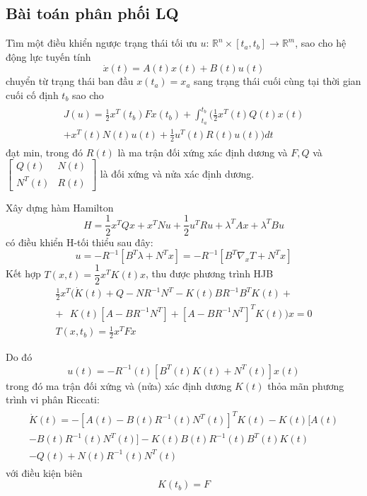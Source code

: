 \documentclass[11pt]{beamer}
\begin{document}
\subsection{Bài toán phân phối LQ}
\begin{frame}
	Tìm một điều khiển ngược trạng thái tối ưu $u$: $\mathbb{R}^n \times [t_a, t_b] \to \mathbb{R}^m$, sao cho hệ động lực tuyến tính \begin{equation}
	\dot{x}(t)=A(t)x(t) + B(t)u(t)
	\end{equation} chuyển từ trạng thái ban đầu $x(t_a) = x_a$ sang trạng thái cuối cùng tại thời gian cuối cố định $t_b$ sao cho
	\begin{eqnarray}
	\begin{split}
		J(u) =  \frac{1}{2}x^T(t_b)Fx(t_b) + \int_{t_a}^{t_b}\Big(\frac{1}{2}x^T(t)Q(t)x(t) \\ + x^T(t)N(t)u(t) + \frac{1}{2}u^T(t)R(t)u(t)\Big)dt
	\end{split}
	\end{eqnarray} đạt min, trong đó $R(t)$ là ma trận đối xứng xác định dương và $F, Q$ và $\begin{bmatrix}
	Q(t)&N(t)\\N^T(t)&R(t)
	\end{bmatrix}$ là đối xứng và nửa xác định dương.
\end{frame}

\begin{frame}
	Xây dựng hàm Hamilton \begin{equation}
		H = \frac{1}{2}x^TQx + x^TNu + \frac{1}{2}u^TRu + \lambda^TAx + \lambda^TBu
	\end{equation} có điều khiển H-tối thiểu sau đây: \begin{equation}
		u = -R^{-1}[B^T\lambda + N^Tx] = -R^{-1}[B^T\nabla_xT + N^Tx]
	\end{equation} Kết hợp $T(x, t) = \dfrac{1}{2}x^TK(t)x$, thu được phương trình HJB
	\begin{eqnarray}
	\frac{1}{2}x^T \Big(\dot{K}(t) + Q - NR^{-1}N^T - K(t)BR^{-1}B^TK(t) + \nonumber \\ + \text{ } K(t)[A-BR^{-1}N^T] + [A - BR^{-1}N^T]^TK(t)\Big)x = 0 \\
	T(x, t_b) = \frac{1}{2}x^TFx 
	\end{eqnarray}
\end{frame}


\begin{frame}
		Do đó \begin{equation}
			u(t) = -R^{-1}(t)[B^T(t)K(t) + N^T(t)]x(t)
		\end{equation}
	trong đó ma trận đối xứng và (nửa) xác định dương $K(t)$ thỏa mãn phương trình vi phân Riccati:
	\begin{eqnarray}
	\begin{split}
	\dot{K}(t) = -[A(t) - B(t)R^{-1}(t)N^T(t)]^TK(t) - K(t)[A(t) \\- B(t)R^{-1}(t)N^T(t)] -K(t)B(t)R^{-1}(t)B^T(t)K(t) \\ - Q(t) + N(t)R^{-1}(t)N^T(t) 
	\end{split}	
	\end{eqnarray} với điều kiện biên $$K(t_b) = F$$
\end{frame}
\end{document}
